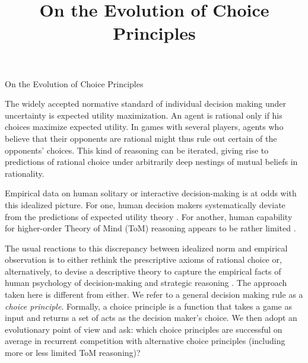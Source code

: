 \documentclass[10pt]{article}
\title{On the Evolution of Choice Principles}
\author{}
\date{}
\begin{document}
\begin{center}
  \begin{large}
    On the Evolution of Choice Principles
  \end{large}
\end{center}



\noindent The widely accepted normative standard of individual decision making
under uncertainty is expected utility maximization. An agent is
rational only if his choices maximize expected utility. In games with
several players, agents who believe that their opponents are rational
might thus rule out certain of the opponents' choices. This kind of
reasoning can be iterated, giving rise to predictions of rational
choice under arbitrarily deep nestings of mutual beliefs in
rationality. %

Empirical data on human solitary or interactive decision-making is at
odds with this idealized picture. For one, human decision makers
systematically deviate from the predictions of expected utility theory
\citep[e.g.][]{TverskyKahnemann1974:Judgement-under,TverskyKahnemann1981:The-Framing-of-}. For
another, human capability for higher-order Theory of Mind (ToM)
reasoning appears to be rather limited \citep[e.g.][inter
alia]{HoCamerer1998:Iterated-Domina,KeyzarLin2003:Limits-on-Theor,VerbruggeMol2008:Learning-to-App,DegenFranke2013:Cost-Based-Prag}.

The usual reactions to this discrepancy between idealized norm and
empirical observation is to either rethink the prescriptive axioms of
rational choice or, alternatively, to devise a descriptive theory to
capture the empirical facts of human psychology of decision-making and
strategic reasoning
\citep[e.g.][]{Camerer2003:Behavioral-Game,GlimcherCamerer2009:Neuroeconomics:}. The
approach taken here is different from either. We refer to a general
decision making rule as a \emph{choice principle}. Formally, a choice
principle is a function that takes a game as input and returns a set
of acts as the decision maker's choice. We then adopt an evolutionary
point of view and ask: which choice principles are successful on
average in recurrent competition with alternative choice principles
(including more or less limited ToM reasoning)?
\end{document}
